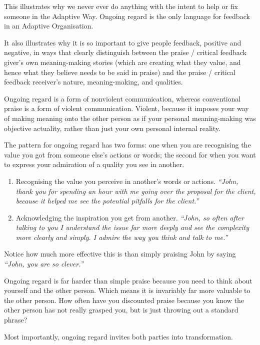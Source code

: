 This illustrates why we never ever do anything with the intent to help or fix someone in the Adaptive Way. Ongoing regard is the only language for feedback in an Adaptive Organisation. 


It also illustrates why it is so important to give people feedback,  positive and negative, in ways that clearly distinguish between the praise / critical feedback giver's own meaning\hyp{}making stories (which are creating what they value, and hence what they believe needs to be said in praise) and the praise / critical feedback receiver's nature, meaning\hyp{}making, and qualities. 


Ongoing regard is a form of nonviolent communication, whereas conventional praise is a form of violent communication. Violent, because it imposes your way of making meaning onto the other person as if your personal meaning\hyp{}making was objective actuality, rather than just your own personal internal reality. 


The pattern for ongoing regard has two forms: one when you are recognising the value you got from someone else's actions or words; the second for when you want to express your admiration of a quality you see in another. 




\begin{enumerate}
\item Recognising the value you perceive in another's words or actions. \emph{“John, thank you for spending an hour with me going over the proposal for the client, because it helped me see the potential pitfalls for the client.”}
\item Acknowledging the inspiration you get from another. \emph{“John, so often after talking to you I understand the issue far more deeply and see the complexity more clearly and simply. I admire the way you think and talk to me.”}
\end{enumerate}


Notice how much more effective this is than simply praising John by saying \emph{“John, you are so clever.”}


Ongoing regard is far harder than simple praise because you need to think about yourself and the other person. Which means it is invariably far more valuable to the other person. How often have you discounted praise because you know the other person has not really grasped you, but is just throwing out a standard phrase?


Most importantly, ongoing regard invites both parties into transformation. 


